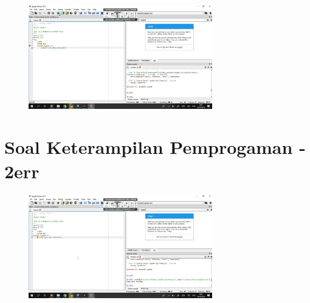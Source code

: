 \begin{figure}[H]
	\centering
	\includegraphics[width=8cm]{figures/12er1.jpg}
\end{figure}

\section{Soal Keterampilan Pemprogaman - 2err}

\begin{figure}[H]
	\centering
	\includegraphics[width=8cm]{figures/12.jpg}
\end{figure}




